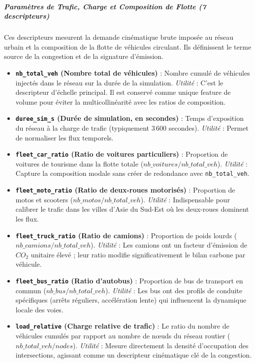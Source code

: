 \documentclass[10pt, a4paper]{article}
\providecommand{\tightlist}{}
\begin{document}
\subparagraph{Paramètres de Trafic, Charge et Composition de Flotte (7
descripteurs)}\label{paramuxe8tres-de-trafic-charge-et-composition-de-flotte-7-descripteurs}

Ces descripteurs mesurent la demande cinématique brute imposée au réseau
urbain et la composition de la flotte de véhicules circulant. Ils
définissent le terme source de la congestion et de la signature
d'émission.

\begin{itemize}
\tightlist
\item
  \textbf{\texttt{nb\_total\_veh} (Nombre total de véhicules)} : Nombre
  cumulé de véhicules injectés dans le réseau sur la durée de la
  simulation. \emph{Utilité} : C'est le descripteur d'échelle principal.
  Il est conservé comme unique feature de volume pour éviter la
  multicollinéarité avec les ratios de composition.
\item
  \textbf{\texttt{duree\_sim\_s} (Durée de simulation, en secondes)} :
  Temps d'exposition du réseau à la charge de trafic (typiquement 3\,600
  secondes). \emph{Utilité} : Permet de normaliser les flux temporels.
\item
  \textbf{\texttt{fleet\_car\_ratio} (Ratio de voitures particuliers)} :
  Proportion de voitures de tourisme dans la flotte totale
  (\(nb\_voitures / nb\_total\_veh\)). \emph{Utilité} : Capture la
  composition modale sans créer de redondance avec
  \texttt{nb\_total\_veh}.
\item
  \textbf{\texttt{fleet\_moto\_ratio} (Ratio de deux-roues motorisés)} :
  Proportion de motos et scooters (\(nb\_motos / nb\_total\_veh\)).
  \emph{Utilité} : Indispensable pour calibrer le trafic dans les villes
  d'Asie du Sud-Est où les deux-roues dominent les flux.
\item
  \textbf{\texttt{fleet\_truck\_ratio} (Ratio de camions)} : Proportion
  de poids lourds (\(nb\_camions / nb\_total\_veh\)). \emph{Utilité} :
  Les camions ont un facteur d'émission de \(CO_2\) unitaire élevé ;
  leur ratio modifie significativement le bilan carbone par véhicule.
\item
  \textbf{\texttt{fleet\_bus\_ratio} (Ratio d'autobus)} : Proportion de
  bus de transport en commun (\(nb\_bus / nb\_total\_veh\)).
  \emph{Utilité} : Les bus ont des profils de conduite spécifiques
  (arrêts réguliers, accélération lente) qui influencent la dynamique
  locale des voies.
\item
  \textbf{\texttt{load\_relative} (Charge relative de trafic)} : Le
  ratio du nombre de véhicules cumulés par rapport au nombre de nœuds du
  réseau routier (\(nb\_total\_veh / nodes\)). \emph{Utilité} : Mesure
  directement la densité d'occupation des intersections, agissant comme
  un descripteur cinématique clé de la congestion.
\end{itemize}
\end{document}
